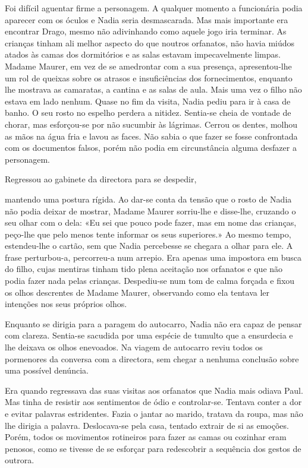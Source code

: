 Foi difícil aguentar firme a personagem. A qualquer momento a
funcionária podia aparecer com os óculos e Nadia seria desmascarada. Mas
mais importante era encontrar Drago, mesmo não adivinhando como aquele
jogo iria terminar. As crianças tinham ali melhor aspecto do que noutros
orfanatos, não havia miúdos atados às camas dos dormitórios e as salas
estavam impecavelmente limpas. Madame Maurer, em vez de se amedrontar
com a sua presença, apresentou-lhe um rol de queixas sobre os atrasos e
insuficiências dos fornecimentos, enquanto lhe mostrava as camaratas, a
cantina e as salas de aula. Mais uma vez o filho não estava em lado
nenhum. Quase no fim da visita, Nadia pediu para ir à casa de banho. O
seu rosto no espelho perdera a nitidez. Sentia-se cheia de vontade de
chorar, mas esforçou-se por não sucumbir às lágrimas. Cerrou os dentes,
molhou as mãos na água fria e lavou as faces. Não sabia o que fazer se
fosse confrontada com os documentos falsos, porém não podia em
circunstância alguma desfazer a personagem.

Regressou ao gabinete da directora para se despedir,

mantendo uma postura rígida. Ao dar-se conta da tensão que o rosto de
Nadia não podia deixar de mostrar, Madame Maurer sorriu-lhe e disse-lhe,
cruzando o seu olhar com o dela: «Eu sei que pouco pode fazer, mas em
nome das crianças, peço-lhe que pelo menos tente informar os seus
superiores.» Ao mesmo tempo, estendeu-lhe o cartão, sem que Nadia
percebesse se chegara a olhar para ele. A frase perturbou-a, percorreu-a
num arrepio. Era apenas uma impostora em busca do filho, cujas mentiras
tinham tido plena aceitação nos orfanatos e que não podia
fazer nada pelas crianças. Despediu-se num tom de calma forçada e fixou
os olhos descrentes de Madame Maurer, observando como ela tentava ler
intenções nos seus próprios olhos.

Enquanto se dirigia para a paragem do autocarro, Nadia não era capaz de
pensar com clareza. Sentia-se sacudida por uma espécie de tumulto que a
ensurdecia e lhe deixava os olhos enevoados. Na viagem de autocarro
reviu todos os pormenores da conversa com a directora, sem chegar a
nenhuma conclusão sobre uma possível denúncia.

Era quando regressava das suas visitas aos orfanatos que Nadia mais
odiava Paul. Mas tinha de resistir aos sentimentos de ódio e
controlar-se. Tentava conter a dor e evitar palavras estridentes. Fazia
o jantar ao marido, tratava da roupa, mas não lhe dirigia a palavra.
Deslocava-se pela casa, tentado extrair de si as emoções. Porém, todos
os movimentos rotineiros para fazer as camas ou cozinhar eram penosos,
como se tivesse de se esforçar para redescobrir a sequência dos gestos
de outrora.

